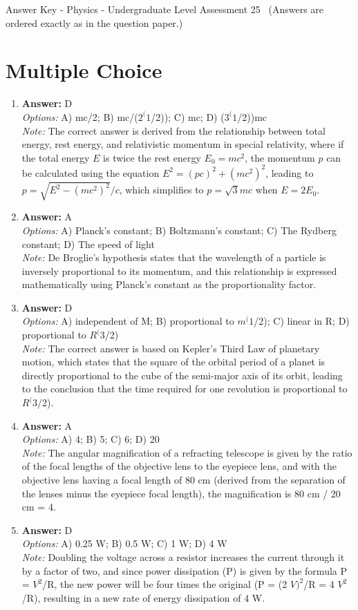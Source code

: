 \documentclass[12pt]{article}
\begin{document}
\begin{center}
Answer Key - Physics - Undergraduate Level Assessment 25 \
\small (Answers are ordered exactly as in the question paper.)
\end{center}

\section*{Multiple Choice}
\begin{enumerate}[label=\arabic*.]
\item \textbf{Answer:} D
\\ \textit{Options:} A) mc/2; B) mc/($2^(1$/2)); C) mc; D) ($3^(1$/2))mc
\\ \textit{Note:} The correct answer is derived from the relationship between total energy, rest energy, and relativistic momentum in special relativity, where if the total energy \(E\) is twice the rest energy \(E_0 = mc^2\), the momentum \(p\) can be calculated using the equation \(E^2 = (pc)^2 + (m c^2)^2\), leading to \(p = \sqrt{E^2 - (m c^2)^2}/c\), which simplifies to \(p = \sqrt{3}mc\) when \(E = 2 E_0\).
\item \textbf{Answer:} A
\\ \textit{Options:} A) Planck's constant; B) Boltzmann's constant; C) The Rydberg constant; D) The speed of light
\\ \textit{Note:} De Broglie's hypothesis states that the wavelength of a particle is inversely proportional to its momentum, and this relationship is expressed mathematically using Planck's constant as the proportionality factor.
\item \textbf{Answer:} D
\\ \textit{Options:} A) independent of M; B) proportional to $m^(1$/2); C) linear in R; D) proportional to $R^(3$/2)
\\ \textit{Note:} The correct answer is based on Kepler's Third Law of planetary motion, which states that the square of the orbital period of a planet is directly proportional to the cube of the semi-major axis of its orbit, leading to the conclusion that the time required for one revolution is proportional to $R^(3$/2).
\item \textbf{Answer:} A
\\ \textit{Options:} A) 4; B) 5; C) 6; D) 20
\\ \textit{Note:} The angular magnification of a refracting telescope is given by the ratio of the focal lengths of the objective lens to the eyepiece lens, and with the objective lens having a focal length of 80 cm (derived from the separation of the lenses minus the eyepiece focal length), the magnification is 80 cm / 20 cm = 4.
\item \textbf{Answer:} D
\\ \textit{Options:} A) 0.25 W; B) 0.5 W; C) 1 W; D) 4 W
\\ \textit{Note:} Doubling the voltage across a resistor increases the current through it by a factor of two, and since power dissipation (P) is given by the formula P = $V^2$/R, the new power will be four times the original (P = (2 $V)^2$/R = 4 $V^2$/R), resulting in a new rate of energy dissipation of 4 W.
\end{enumerate}
\end{document}
